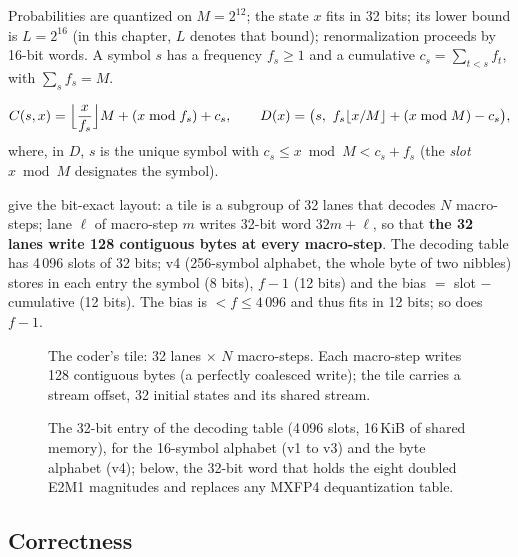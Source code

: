 Probabilities are quantized on $M = 2^{12}$; the state $x$ fits in 32 bits; its lower bound is $L = 2^{16}$ (in this chapter, $L$ denotes that bound); renormalization proceeds by 16-bit words. A symbol $s$ has a frequency $f_s \ge 1$ and a cumulative $c_s = \sum_{t<s} f_t$, with $\sum_s f_s = M$.

\begin{definition}\label{def:rans}
\[
C(s, x) = \Bigl\lfloor \frac{x}{f_s} \Bigr\rfloor M + (x \bmod f_s) + c_s,
\qquad
D(x) = \bigl(s,\ f_s \lfloor x/M \rfloor + (x \bmod M) - c_s\bigr),
\]
where, in $D$, $s$ is the unique symbol with $c_s \le x \bmod M < c_s + f_s$ (the \emph{slot} $x \bmod M$ designates the symbol).
\end{definition}

 give the bit-exact layout: a tile is a subgroup of 32 lanes that decodes $N$ macro-steps; lane $\ell$ of macro-step $m$ writes 32-bit word $32m + \ell$, so that \textbf{the 32 lanes write 128 contiguous bytes at every macro-step}. The decoding table has 4\,096 slots of 32 bits; v4 (256-symbol alphabet, the whole byte of two nibbles) stores in each entry the symbol (8 bits), $f - 1$ (12 bits) and the bias $=$ slot $-$ cumulative (12 bits). The bias is $< f \le 4\,096$ and thus fits in 12 bits; so does $f - 1$.

\begin{figure}[ht]
\centering
\resizebox{\linewidth}{!}{\SchemaTuileRans}
\caption[The tile of the interleaved rANS coder]{The coder's tile: 32 lanes $\times$ $N$ macro-steps. Each macro-step writes 128 contiguous bytes (a perfectly coalesced write); the tile carries a stream offset, 32 initial states and its shared stream.}
\label{fig:ent-tuile}
\end{figure}

\begin{figure}[ht]
\centering
\resizebox{\linewidth}{!}{\SchemaEntreeTable}
\caption[The decoding-table entry, bit by bit]{The 32-bit entry of the decoding table (4\,096 slots, 16\,KiB of shared memory), for the 16-symbol alphabet (v1 to v3) and the byte alphabet (v4); below, the 32-bit word that holds the eight doubled E2M1 magnitudes and replaces any MXFP4 dequantization table.}
\label{fig:ent-entree}
\end{figure}

\subsection{Correctness}

